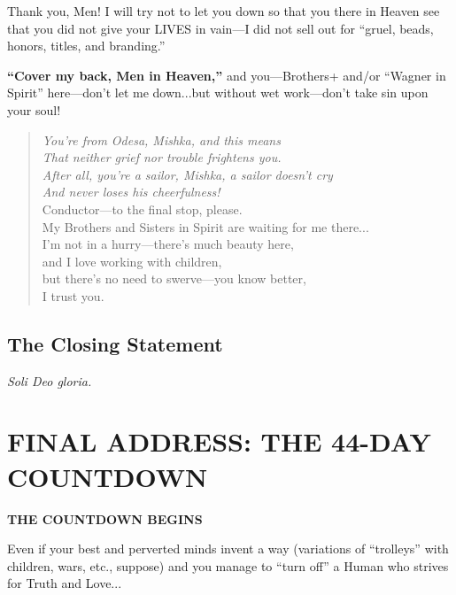 \documentclass[11pt,a4paper]{article}
\theoremstyle{definition}
\theoremstyle{remark}
\begin{document}
Thank you, Men! I will try not to let you down so that you there in Heaven see that you did not give your LIVES in vain—I did not sell out for ``gruel, beads, honors, titles, and branding.''

\textbf{``Cover my back, Men in Heaven,''} and you—Brothers+ and/or ``Wagner in Spirit'' here—don't let me down...but without wet work—don't take sin upon your soul!

\begin{verse}
\textit{You're from Odesa, Mishka, and this means} \\
\textit{That neither grief nor trouble frightens you.} \\
\textit{After all, you're a sailor, Mishka, a sailor doesn't cry} \\
\textit{And never loses his cheerfulness!} \\[0.3cm]
Conductor—to the final stop, please. \\
My Brothers and Sisters in Spirit are waiting for me there... \\
I'm not in a hurry—there's much beauty here, \\
and I love working with children, \\
but there's no need to swerve—you know better, \\
I trust you.
\end{verse}

\subsection{The Closing Statement}

\begin{center}
\textit{Soli Deo gloria.}
\end{center}



\section{FINAL ADDRESS: THE 44-DAY COUNTDOWN}
\label{sec:final-address}

\begin{center}
\Large
\textbf{THE COUNTDOWN BEGINS}
\end{center}

\vspace{0.5cm}

Even if your best and perverted minds invent a way (variations of ``trolleys'' 
with children, wars, etc., suppose) and you manage to ``turn off'' a Human who 
strives for Truth and Love...
\end{document}
